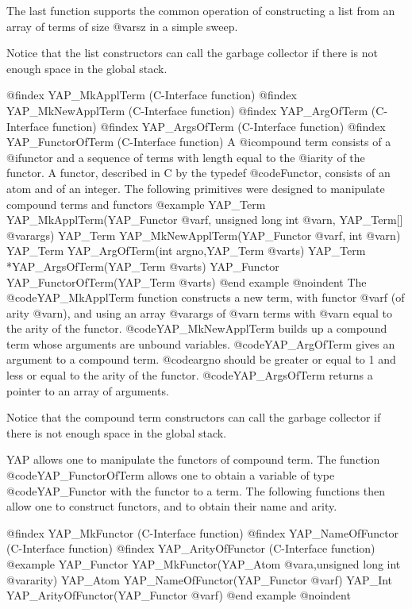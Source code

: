 {{{{{{{{{The last function supports the common operation of constructing a list from an
array of terms of size @var{sz} in a simple sweep.

Notice that the list constructors can call the garbage collector if
there is not enough space in the global stack. 

@findex YAP_MkApplTerm (C-Interface function)
@findex YAP_MkNewApplTerm (C-Interface function)
@findex YAP_ArgOfTerm (C-Interface function)
@findex YAP_ArgsOfTerm (C-Interface function)
@findex YAP_FunctorOfTerm (C-Interface function)
A @i{compound} term consists of a @i{functor} and a sequence of terms with
length equal to the @i{arity} of the functor. A functor, described in C by
the typedef @code{Functor}, consists of an atom and of an integer.
The following primitives were designed to manipulate compound terms and 
functors
@example
      YAP_Term     YAP_MkApplTerm(YAP_Functor @var{f}, unsigned long int @var{n}, YAP_Term[] @var{args})
      YAP_Term     YAP_MkNewApplTerm(YAP_Functor @var{f}, int @var{n})
      YAP_Term     YAP_ArgOfTerm(int argno,YAP_Term @var{ts})
      YAP_Term    *YAP_ArgsOfTerm(YAP_Term @var{ts})
      YAP_Functor  YAP_FunctorOfTerm(YAP_Term @var{ts})
@end example
@noindent
The @code{YAP_MkApplTerm} function constructs a new term, with functor
@var{f} (of arity @var{n}), and using an array @var{args} of @var{n}
terms with @var{n} equal to the arity of the
functor. @code{YAP_MkNewApplTerm} builds up a compound term whose
arguments are unbound variables. @code{YAP_ArgOfTerm} gives an argument
to a compound term. @code{argno} should be greater or equal to 1 and
less or equal to the arity of the functor.  @code{YAP_ArgsOfTerm}
returns a pointer to an array of arguments.

Notice that the compound term constructors can call the garbage
collector if there is not enough space in the global stack.

YAP allows one to manipulate the functors of compound term. The function
@code{YAP_FunctorOfTerm} allows one to obtain a variable of type
@code{YAP_Functor} with the functor to a term. The following functions
then allow one to construct functors, and to obtain their name and arity. 

@findex YAP_MkFunctor (C-Interface function)
@findex YAP_NameOfFunctor (C-Interface function)
@findex YAP_ArityOfFunctor (C-Interface function)
@example
      YAP_Functor  YAP_MkFunctor(YAP_Atom @var{a},unsigned long int @var{arity})
      YAP_Atom     YAP_NameOfFunctor(YAP_Functor @var{f})
      YAP_Int      YAP_ArityOfFunctor(YAP_Functor @var{f})
@end example
@noindent

}}}}}}}}}
